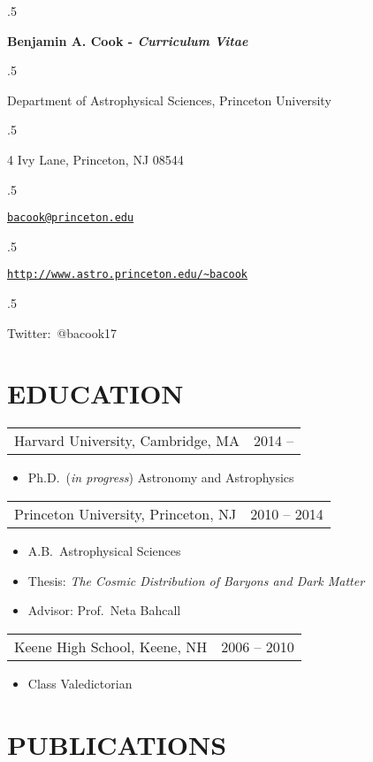 \documentclass[margin]{res}
\newcommand\mancenter[1]{\moveleft.5\hoffset\centerline{#1}}
\begin{document}
  
\mancenter{\huge \bf{Benjamin A. Cook} -
  \textit{Curriculum Vitae}} \mancenter{\large Department of
  Astrophysical Sciences, Princeton University} \mancenter{\large 4
  Ivy Lane, Princeton, NJ 08544}
\mancenter{\large\tt\href{mailto:bacook@princeton.edu}{bacook@princeton.edu}}
\mancenter{\large\tt\url{http://www.astro.princeton.edu/~bacook}}
\mancenter{\large Twitter:~@bacook17}
\begin{resume}                        
 
 
\section{EDUCATION}       
\begin{tabular}{@{}p{4in} r@{}}
Harvard University, Cambridge, MA & 2014 --
\end{tabular}
\begin{itemize} \itemsep -2pt
\item[] Ph.D.~(\textit{in progress}) Astronomy and Astrophysics
\end{itemize}

\begin{tabular}{@{}p{4in} r@{}}
  Princeton University, Princeton, NJ & 2010 -- 2014
\end{tabular}
\begin{itemize} \itemsep -2pt
\item[] A.B.~Astrophysical Sciences
\item[] Thesis: \textit{The Cosmic Distribution of
  Baryons and Dark Matter}
\item[] Advisor: Prof.~Neta Bahcall
\end{itemize}

\begin{tabular}{@{}p{4in} r@{}}
  Keene High School, Keene, NH & 2006 -- 2010
\end{tabular}
\begin{itemize} \itemsep -2pt
\item[] Class Valedictorian
\end{itemize}

\section{PUBLICATIONS}


\end{resume}
\end{document}
